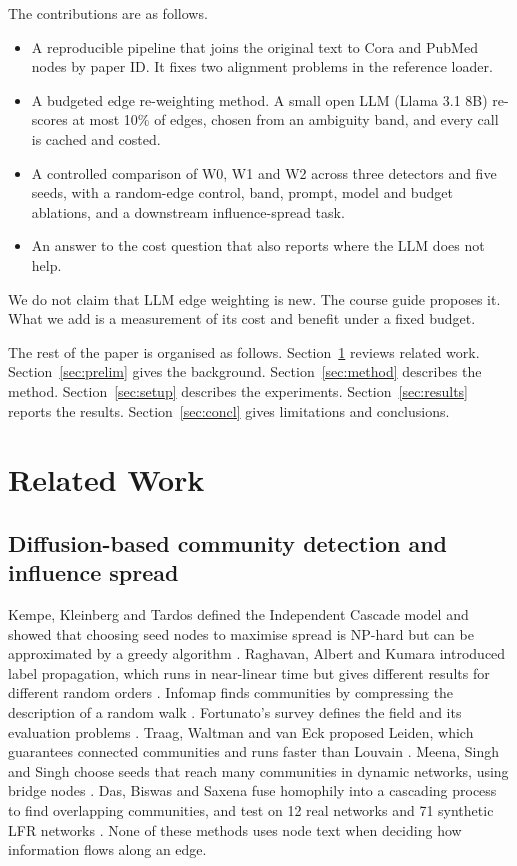 \documentclass[journal]{IEEEtran}
\begin{document}
The contributions are as follows.
\begin{itemize}
\item A reproducible pipeline that joins the original text to Cora and PubMed nodes by paper ID. It fixes two alignment problems in the reference loader.
\item A budgeted edge re-weighting method. A small open LLM (Llama 3.1 8B) re-scores at most 10\% of edges, chosen from an ambiguity band, and every call is cached and costed.
\item A controlled comparison of W0, W1 and W2 across three detectors and five seeds, with a random-edge control, band, prompt, model and budget ablations, and a downstream influence-spread task.
\item An answer to the cost question that also reports where the LLM does not help.
\end{itemize}
We do not claim that LLM edge weighting is new. The course guide proposes it. What we add is a measurement of its cost and benefit under a fixed budget.

The rest of the paper is organised as follows. Section~\ref{sec:related} reviews related work. Section~\ref{sec:prelim} gives the background. Section~\ref{sec:method} describes the method. Section~\ref{sec:setup} describes the experiments. Section~\ref{sec:results} reports the results. Section~\ref{sec:concl} gives limitations and conclusions.

\section{Related Work}
\label{sec:related}

\subsection{Diffusion-based community detection and influence spread}
Kempe, Kleinberg and Tardos defined the Independent Cascade model and showed that choosing seed nodes to maximise spread is NP-hard but can be approximated by a greedy algorithm \cite{kempe2003}. Raghavan, Albert and Kumara introduced label propagation, which runs in near-linear time but gives different results for different random orders \cite{raghavan2007}. Infomap finds communities by compressing the description of a random walk \cite{rosvall2008}. Fortunato's survey defines the field and its evaluation problems \cite{fortunato2010}. Traag, Waltman and van Eck proposed Leiden, which guarantees connected communities and runs faster than Louvain \cite{traag2019}. Meena, Singh and Singh choose seeds that reach many communities in dynamic networks, using bridge nodes \cite{meena2024}. Das, Biswas and Saxena fuse homophily into a cascading process to find overlapping communities, and test on 12 real networks and 71 synthetic LFR networks \cite{das2026}. None of these methods uses node text when deciding how information flows along an edge.
\end{document}
